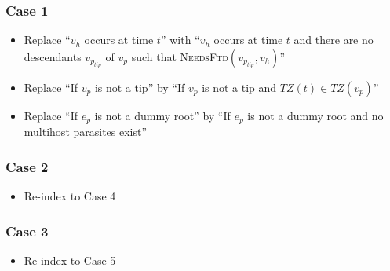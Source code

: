 \documentclass{article}
\begin{document}
\subsubsection{Case 1}
\begin{itemize}
\item Replace ``$v_{h}$  occurs at time $t$'' with ``$v_{h}$ occurs at time $t$ and there are no descendants $v_{p_{tip}}$ of $v_{p}$ such that \textsc{NeedsFtd}$(v_{p_{tip}}, v_{h})$''

\item Replace ``If $v_{p}$ is not a tip'' by ``If $v_{p}$ is not a tip and $TZ(t) \in TZ(v_{p})$''

\item Replace ``If $e_{p}$ is not a dummy root'' by ``If $e_{p}$ is not a dummy root and no multihost parasites exist''

\end{itemize}

\subsubsection{Case 2}
\begin{itemize}
\item Re-index to Case 4
\end{itemize}

\subsubsection{Case 3}
\begin{itemize}
\item Re-index to Case 5
 \end{itemize}
\end{document}
